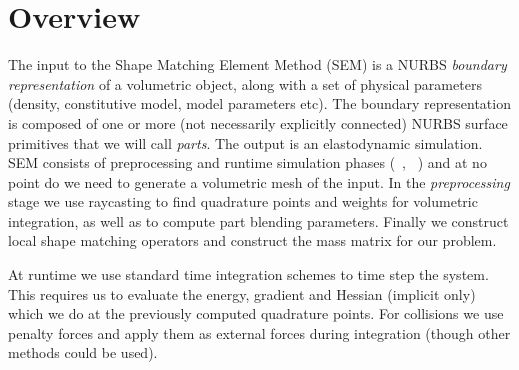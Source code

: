 \section{Overview}
The input to the Shape Matching Element Method (SEM)  is a NURBS \emph{boundary representation} of a volumetric object, along with a set of physical parameters 
(density, constitutive model, model parameters etc). 
The boundary representation is composed of one or more (not necessarily explicitly connected) NURBS surface primitives that we will call \emph{parts}.
The output is an elastodynamic simulation. 
SEM consists of preprocessing and runtime simulation phases (~, ~) and at no point do we need to generate a volumetric mesh of the input. 
In the \emph{preprocessing} stage we use raycasting to find quadrature points and weights for volumetric integration, as well as to compute part blending parameters. 
Finally we construct local shape matching operators and construct the mass matrix for our problem. 

At runtime we use standard time integration schemes to time step the system. 
This requires us to evaluate the energy, gradient and Hessian (implicit only) which we do at the previously computed quadrature points. 
For collisions we use penalty forces and apply them as external forces during integration (though other methods could be used).

